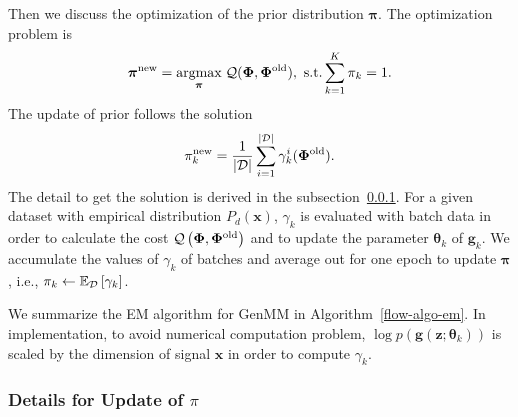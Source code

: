 Then we discuss the optimization of the prior distribution $\bm{\pi}$. The optimization problem is 
\begin{equation}\label{eq-pi-update1}
  \bm{\pi}^{\mathrm{new}} = \underset{\bm{\pi}}{\operatorname{argmax}}\;{ \mathcal{Q}
  (\bm{\Phi},\bm{\Phi}^{\mathrm{old}})}, \,\,
  \mathrm{s.t.} \sum_{k=1}^{K}\pi_k = 1.
\end{equation}
The update of prior follows the solution
\begin{equation}\label{eq-pi-solution}
  \pi_k^{\mathrm{new}} = \frac{1}{| \mathcal{D} |}\sum_{i=1}^{| \mathcal{D} |}\gamma_k^{i}(\bm{\Phi}^{\mathrm{old}}).
\end{equation}
The detail to get the solution is derived in the subsection~\ref{subsubsec:Proof_for_update}. For a given dataset with empirical distribution $P_d(\bm{x})$,
$\gamma_k$ is evaluated with batch data in order to calculate the cost
$\mathcal{Q}\left(\bm{\Phi},\bm{\Phi}^{\mathrm{old}}\right)$ and to update the
parameter $\bm{\theta}_k$ of $\bm{g}_k$. We accumulate the values of $\gamma_k$ of batches and
average out for one epoch to update $\bm{\pi}$, {i.e.}, $\pi_k \gets \mathbb{E}_{\mathcal{D}}\left[ \gamma_k \right]$.



We summarize the EM algorithm for GenMM in Algorithm~\autoref{flow-algo-em}.
In implementation, to avoid numerical computation problem, $\log{p(\bm{g}(\bm{z}; \bm{\theta}_k))}$ is
scaled by the dimension of signal $\bm{x}$ in order to compute $\gamma_k$. 



\subsubsection{Details for Update of $\pi$}
\label{subsubsec:Proof_for_update}

